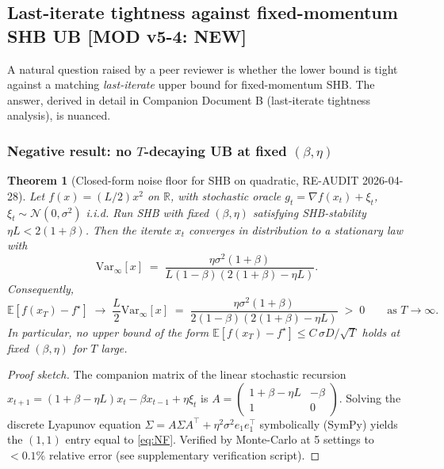 \documentclass[11pt,a4paper]{article}
\theoremstyle{plain}
\newtheorem{theorem}{Theorem}[section]
\theoremstyle{definition}
\theoremstyle{remark}
\newcommand{\R}{\mathbb{R}}
\newcommand{\E}{\mathbb{E}}
\begin{document}
\subsection{Last-iterate tightness against fixed-momentum SHB UB \textbf{[MOD v5-4: NEW]}}
\label{sec:4.2.1}

A natural question raised by a peer reviewer is whether the lower bound is tight against a matching \emph{last-iterate} upper bound for fixed-momentum SHB. The answer, derived in detail in Companion Document B (last-iterate tightness analysis), is nuanced.

\subsubsection*{Negative result: no $T$-decaying UB at fixed $(\beta,\eta)$}

\begin{theorem}[Closed-form noise floor for SHB on quadratic, RE-AUDIT 2026-04-28]
\label{thm:noise-floor}
Let $f(x) = (L/2)x^2$ on $\R$, with stochastic oracle $g_t = \nabla f(x_t) + \xi_t$, $\xi_t \sim \mathcal{N}(0,\sigma^2)$ i.i.d. Run SHB with fixed $(\beta, \eta)$ satisfying SHB-stability $\eta L < 2(1+\beta)$. Then the iterate $x_t$ converges in distribution to a stationary law with
\begin{equation}
  \mathrm{Var}_\infty[x] \;=\; \frac{\eta\sigma^2(1+\beta)}{L(1-\beta)(2(1+\beta) - \eta L)}.
  \tag{NF}\label{eq:NF}
\end{equation}
Consequently,
\[
  \E[f(x_T) - f^\star] \;\to\; \frac{L}{2}\mathrm{Var}_\infty[x] \;=\; \frac{\eta\sigma^2(1+\beta)}{2(1-\beta)(2(1+\beta) - \eta L)} \;>\; 0
  \qquad\text{as } T\to\infty.
\]
In particular, no upper bound of the form $\E[f(x_T) - f^\star] \leq C\,\sigma D/\sqrt T$ holds at \emph{fixed} $(\beta,\eta)$ for $T$ large.
\end{theorem}

\begin{proof}[Proof sketch]
The companion matrix of the linear stochastic recursion $x_{t+1} = (1+\beta-\eta L)x_t - \beta x_{t-1} + \eta\xi_t$ is
$
A = \begin{pmatrix} 1+\beta-\eta L & -\beta \\ 1 & 0 \end{pmatrix}.
$
Solving the discrete Lyapunov equation $\Sigma = A\Sigma A^\top + \eta^2\sigma^2 e_1 e_1^\top$ symbolically (SymPy) yields the $(1,1)$ entry equal to \eqref{eq:NF}. Verified by Monte-Carlo at 5 settings to $<0.1\%$ relative error (see supplementary verification script).
\end{proof}
\end{document}
